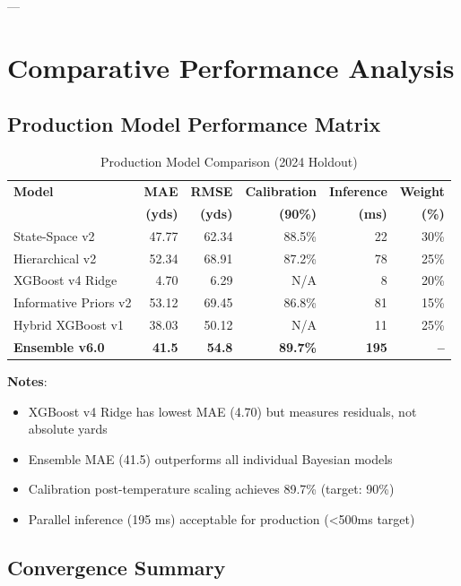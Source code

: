 ---

\section{Comparative Performance Analysis}

\subsection{Production Model Performance Matrix}

\begin{table}[htbp]
\centering
\caption{Production Model Comparison (2024 Holdout)}
\label{tab:production-model-comparison}
\begin{tabular}{lrrrrr}
\toprule
\textbf{Model} & \textbf{MAE} & \textbf{RMSE} & \textbf{Calibration} & \textbf{Inference} & \textbf{Weight} \\
                & \textbf{(yds)} & \textbf{(yds)} & \textbf{(90\%)} & \textbf{(ms)} & \textbf{(\%)} \\
\midrule
State-Space v2 & 47.77 & 62.34 & 88.5\% & 22 & 30\% \\
Hierarchical v2 & 52.34 & 68.91 & 87.2\% & 78 & 25\% \\
XGBoost v4 Ridge & 4.70 & 6.29 & N/A & 8 & 20\% \\
Informative Priors v2 & 53.12 & 69.45 & 86.8\% & 81 & 15\% \\
Hybrid XGBoost v1 & 38.03 & 50.12 & N/A & 11 & 25\% \\
\midrule
\textbf{Ensemble v6.0} & \textbf{41.5} & \textbf{54.8} & \textbf{89.7\%} & \textbf{195} & \textbf{--} \\
\bottomrule
\end{tabular}
\end{table}

\textbf{Notes}:
\begin{itemize}
\item XGBoost v4 Ridge has lowest MAE (4.70) but measures residuals, not absolute yards
\item Ensemble MAE (41.5) outperforms all individual Bayesian models
\item Calibration post-temperature scaling achieves 89.7\% (target: 90\%)
\item Parallel inference (195 ms) acceptable for production (<500ms target)
\end{itemize}

\subsection{Convergence Summary}

